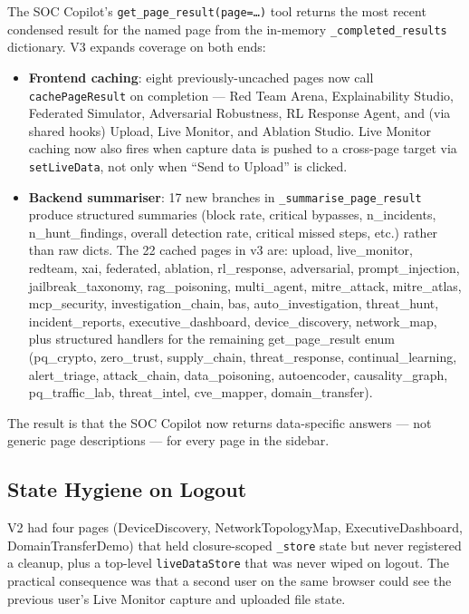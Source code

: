 \documentclass[11pt,a4paper]{article}
\begin{document}
The SOC Copilot's \texttt{get\_page\_result(page=\dots)} tool returns
the most recent condensed result for the named page from the
in-memory \texttt{\_completed\_results} dictionary.  V3 expands
coverage on both ends:

\begin{itemize}[leftmargin=*,nosep]
  \item \textbf{Frontend caching}: eight previously-uncached pages
        now call \texttt{cachePageResult} on completion --- Red Team
        Arena, Explainability Studio, Federated Simulator,
        Adversarial Robustness, RL Response Agent, and (via shared
        hooks) Upload, Live Monitor, and Ablation Studio.  Live
        Monitor caching now also fires when capture data is pushed
        to a cross-page target via \texttt{setLiveData}, not only
        when ``Send to Upload'' is clicked.
  \item \textbf{Backend summariser}: 17 new branches in
        \texttt{\_summarise\_page\_result} produce structured
        summaries (block rate, critical bypasses, n\_incidents,
        n\_hunt\_findings, overall detection rate, critical missed
        steps, etc.) rather than raw dicts.  The 22 cached pages
        in v3 are: upload, live\_monitor, redteam, xai, federated,
        ablation, rl\_response, adversarial, prompt\_injection,
        jailbreak\_taxonomy, rag\_poisoning, multi\_agent,
        mitre\_attack, mitre\_atlas, mcp\_security,
        investigation\_chain, bas, auto\_investigation, threat\_hunt,
        incident\_reports, executive\_dashboard, device\_discovery,
        network\_map, plus structured handlers for the remaining
        get\_page\_result enum (pq\_crypto, zero\_trust,
        supply\_chain, threat\_response, continual\_learning,
        alert\_triage, attack\_chain, data\_poisoning, autoencoder,
        causality\_graph, pq\_traffic\_lab, threat\_intel,
        cve\_mapper, domain\_transfer).
\end{itemize}

The result is that the SOC Copilot now returns data-specific
answers --- not generic page descriptions --- for every page in the
sidebar.

\subsection{State Hygiene on Logout}
\label{sec:reliability:hygiene}

V2 had four pages (DeviceDiscovery, NetworkTopologyMap,
ExecutiveDashboard, DomainTransferDemo) that held closure-scoped
\texttt{\_store} state but never registered a cleanup, plus a
top-level \texttt{liveDataStore} that was never wiped on logout.
The practical consequence was that a second user on the same browser
could see the previous user's Live Monitor capture and uploaded
file state.
\end{document}
